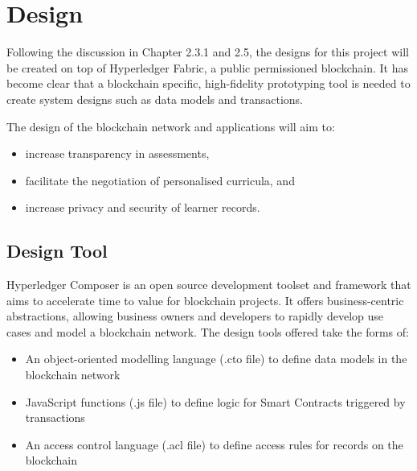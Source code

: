 \chapter{Design}
\graphicspath{{Chapter5/Figs/Raster/}{Chapter5/Figs/Tex/}{Chapter5/Figs/}}

Following the discussion in Chapter 2.3.1 and 2.5, the designs for this project
will be created on top of Hyperledger Fabric, a public permissioned blockchain.
It has become clear that a blockchain specific, high-fidelity prototyping tool is needed
to create system designs such as data models and transactions.

The design of the blockchain network and applications will aim to:
\begin{itemize}
	\setlength\itemsep{0em}	
	\item increase transparency in assessments,
	\item facilitate the negotiation of personalised curricula, and
	\item increase privacy and security of learner records.
\end{itemize}

\section{Design Tool}

Hyperledger Composer is an open source development toolset and framework that aims to
accelerate time to value for blockchain projects. It offers business-centric
abstractions, allowing business owners and developers to rapidly develop
use cases and model a blockchain network. The design tools offered take the forms of:
\begin{itemize}
	\setlength\itemsep{0em}
	\item An object-oriented modelling language (.cto file) to define data models in
	      the blockchain network
	\item JavaScript functions (.js file) to define logic for Smart Contracts triggered by transactions
	\item An access control language (.acl file) to define access rules for records on the blockchain\\
	      \citep{official2018composer}
\end{itemize}

